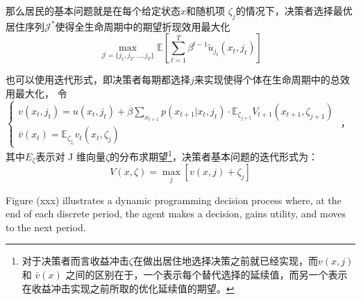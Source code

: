 \documentclass[a4paper,12pt,oneside]{book} %
\begin{document}
那么居民的基本问题就是在每个给定状态$x$和随机项 $\zeta_j$的情况下，决策者选择最优居住序列$\mathcal{J}^*$使得全生命周期中的期望折现效用最大化
\begin{equation}
  \max_{\mathcal{J}=\{j_1,j_2,\ldots,j_T\}} \mathbb{E} [ \sum_{t=1}^{T} \beta^{t-1} \tilde{u}_{j_t}(x_t, j_t) ]
\end{equation}

也可以使用迭代形式，即决策者每期都选择$j$来实现使得个体在生命周期中的总效用最大化，
令
$\begin{cases}
  v(x_{t},j_{t})=u(x_{t} , j_{t} )+\beta \sum_{x_{t+1}} p(x_{t+1}|x_t,j_t) \cdot \mathbb{E}_{\zeta_{j+1}} V_{t+1}(x_{t+1},\zeta_{j+1})
  \\
  \bar v(x_{t})=\mathbb{E}_{\zeta_{j_t}} v_{t}(x_{t},\zeta_{j})
\end{cases}$
，其中$E_{\zeta}$表示对 J 维向量$\zeta$的分布求期望\footnote{对于决策者而言收益冲击$\zeta$在做出居住地选择决策之前就已经实现，而$v(x,j)$ 和 $\bar v(x)$ 之间的区别在于，一个表示每个替代选择的延续值，而另一个表示在收益冲击实现之前所取的优化延续值的期望。}，决策者基本问题的迭代形式为：
\begin{equation}
V(x,\zeta)=\max\limits_{j}[v(x,j)+\zeta_{j}]
\end{equation}

Figure (xxx) illustrates a dynamic programming decision process where, at the end of each discrete period, the agent makes a decision, gains utility, and moves to the next period.
\end{document}
